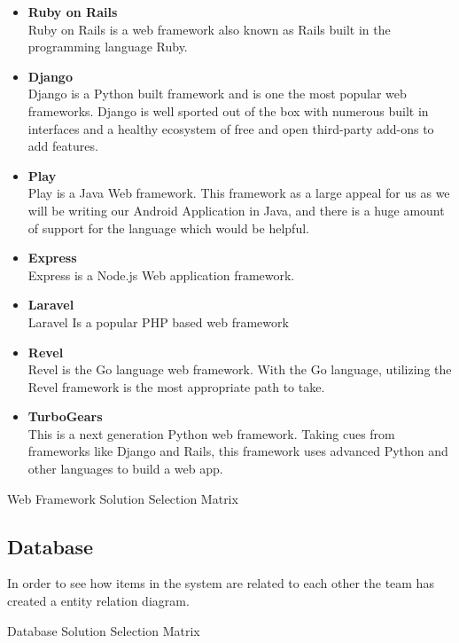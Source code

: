 \documentclass[Letter,11pt]{article}
\begin{document}
		\begin{itemize}
			\item \textbf{Ruby on Rails} \\
			Ruby on Rails is a web framework also known as Rails built in the programming language Ruby. 
			\item \textbf{Django} \\
			Django is a Python built framework and is one the most popular web frameworks. Django is well sported out of the box with numerous built in interfaces and a healthy ecosystem of free and open third-party add-ons to add features.
			\item \textbf{Play} \\
			Play is a Java Web framework. This framework as a large appeal for us as we will be writing our Android Application in Java, and there is a huge amount of support for the language which would be helpful.
			\item  \textbf{Express}\\
			Express is a Node.js Web application framework.
			\item \textbf{Laravel} \\
			Laravel Is a popular PHP based web framework
			\item \textbf{Revel} \\
			Revel is the Go language web framework. With the Go language, utilizing the Revel framework is the most appropriate path to take. 
			\item \textbf{TurboGears}\\
			This is a next generation Python web framework. Taking cues from frameworks like Django and Rails, this framework uses advanced Python and other languages to build a web app.
		\end{itemize}
		
		
	
		\begin{table}[h]
			\centering
			
			\caption{\label{WebMatrix} Web Framework Solution Selection Matrix}
		\end{table}
	
	
	\subsection{Database}
		In order to see how items in the system are related to each other the team has created a entity relation diagram.
		\begin{table}[h]
			\centering
			
			\caption{\label{DBMatrix} Database Solution Selection Matrix}
		\end{table}
		
\end{document}
